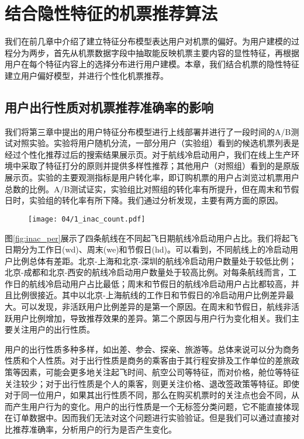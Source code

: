 
\chapter{结合隐性特征的机票推荐算法}
\label{chap:latent}

我们在前几章中介绍了建立特征分布模型表达用户对机票的偏好。为用户建模的过程分为两步，首先从机票数据字段中抽取能反映机票主要内容的显性特征，再根据用户在每个特征内容上的选择分布进行用户建模。本章，我们结合机票的隐性特征建立用户偏好模型，并进行个性化机票推荐。

\section{用户出行性质对机票推荐准确率的影响}

我们将第三章中提出的用户特征分布模型进行上线部署并进行了一段时间的A/B测试对照实验。实验将用户随机分流，一部分用户（实验组）看到的候选机票列表是经过个性化推荐过后的搜索结果展示页。对于航线冷启动用户，我们在线上生产环境中采取了特征打分的原则并提供多样性推荐；其他用户（对照组）看到的是原版展示页。实验的主要观测指标是用户转化率，即订购机票的用户占浏览过机票用户总数的比例。A/B测试证实，实验组比对照组的转化率有所提升，但在周末和节假日时，实验组的转化率有所下降。我们通过分析发现，主要有两方面的原因。

\begin{figure}
 \centering
 \texttt{[image: 04/1\_inac\_count.pdf]}
\end{figure}

图\ref{fig:inac_per}展示了四条航线在不同起飞日期航线冷启动用户占比。我们将起飞日期分为工作日(wd)、周末(we)和节假日(hd)。可以看到，不同航线上的冷启动用户比例总体有差距。北京-上海和北京-深圳的航线冷启动用户数量处于较低比例；北京-成都和北京-西安的航线冷启动用户数量处于较高比例。对每条航线而言，工作日的航线冷启动用户占比最低；周末和节假日的航线冷启动用户占比都较高，并且比例很接近。其中以北京-上海航线的工作日和节假日的冷启动用户比例差异最大。可以发现，非活跃用户比例差异的是第一个原因。在周末和节假日，航线非活跃用户比例增加，导致推荐效果的差异。第二个原因与用户行为变化相关。我们主要关注用户的出行性质。

用户的出行性质多种多样，如出差、参会、探亲、旅游等。总体来说可以分为商务性质和个人性质。对于出行性质是商务的乘客由于其行程安排及工作单位的差旅政策等因素，可能会更多地关注起飞时间、航空公司等特征，而对价格，舱位等特征关注较少；对于出行性质是个人的乘客，则更关注价格、退改签政策等特征。即使对于同一位用户，如果其出行性质不同，那么在购买机票时的关注点也会不同，从而产生用户行为的变化。用户的出行性质是一个无标签分类问题，它不能直接体现在订单数据中。因而我们无法对这个问题进行实验验证。但是我们可以通过直接对比推荐准确率，分析用户的行为是否产生变化。

